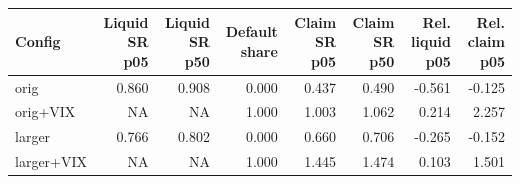 \begin{tabular}{lrrrrrrr}
\toprule
Config & Liquid SR p05 & Liquid SR p50 & Default share & Claim SR p05 & Claim SR p50 & Rel. liquid p05 & Rel. claim p05 \\
\midrule
orig & 0.860 & 0.908 & 0.000 & 0.437 & 0.490 & -0.561 & -0.125 \\
orig+VIX & NA & NA & 1.000 & 1.003 & 1.062 & 0.214 & 2.257 \\
larger & 0.766 & 0.802 & 0.000 & 0.660 & 0.706 & -0.265 & -0.152 \\
larger+VIX & NA & NA & 1.000 & 1.445 & 1.474 & 0.103 & 1.501 \\
\bottomrule
\end{tabular}
